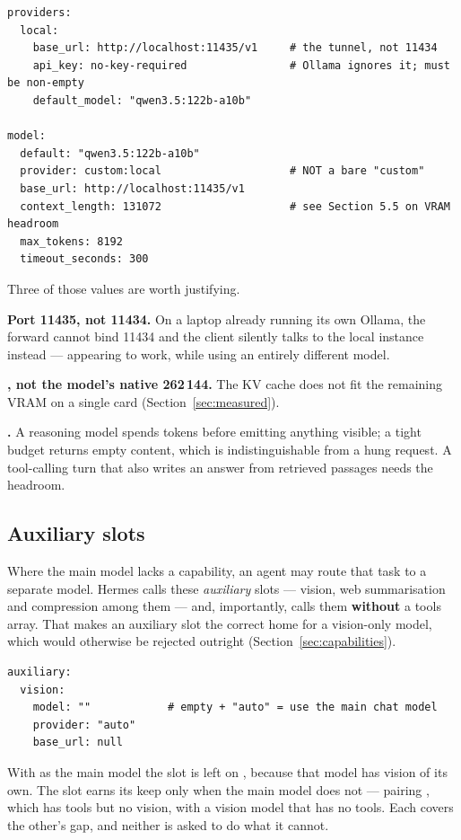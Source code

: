 \begin{lstlisting}
providers:
  local:
    base_url: http://localhost:11435/v1     # the tunnel, not 11434
    api_key: no-key-required                # Ollama ignores it; must be non-empty
    default_model: "qwen3.5:122b-a10b"

model:
  default: "qwen3.5:122b-a10b"
  provider: custom:local                    # NOT a bare "custom"
  base_url: http://localhost:11435/v1
  context_length: 131072                    # see Section 5.5 on VRAM headroom
  max_tokens: 8192
  timeout_seconds: 300
\end{lstlisting}

Three of those values are worth justifying.

\textbf{Port 11435, not 11434.} On a laptop already running its own Ollama, the
forward cannot bind 11434 and the client silently talks to the local instance
instead --- appearing to work, while using an entirely different model.

\textbf{, not the model's native 262\,144.} The KV
cache does not fit the remaining VRAM on a single card
(Section~\ref{sec:measured}).

\textbf{.} A reasoning model spends tokens before
emitting anything visible; a tight budget returns empty content, which is
indistinguishable from a hung request. A tool-calling turn that also writes an
answer from retrieved passages needs the headroom.

\subsection{Auxiliary slots}

Where the main model lacks a capability, an agent may route that task to a
separate model. Hermes calls these \textit{auxiliary} slots --- vision, web
summarisation and compression among them --- and, importantly, calls them
\textbf{without} a tools array. That makes an auxiliary slot the correct home
for a vision-only model, which would otherwise be rejected outright
(Section~\ref{sec:capabilities}).

\begin{lstlisting}
auxiliary:
  vision:
    model: ""            # empty + "auto" = use the main chat model
    provider: "auto"
    base_url: null
\end{lstlisting}

With  as the main model the slot is left on
, because that model has vision of its own. The slot earns its keep
only when the main model does not --- pairing , which has
tools but no vision, with a vision model that has no tools. Each covers the
other's gap, and neither is asked to do what it cannot.

